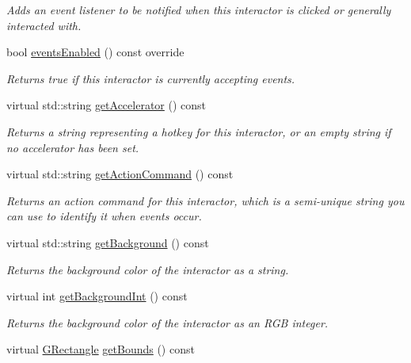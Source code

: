 \begin{DoxyCompactItemize}
\begin{DoxyCompactList}\small\item\em Adds an event listener to be notified when this interactor is clicked or generally interacted with. \end{DoxyCompactList}\item 
bool \mbox{\hyperlink{classGInteractor_a597a370b592e3737d38d9d2f4e2031ea}{events\+Enabled}} () const override
\begin{DoxyCompactList}\small\item\em Returns true if this interactor is currently accepting events. \end{DoxyCompactList}\item 
virtual std\+::string \mbox{\hyperlink{classGInteractor_a69f8d23ed8f207fbecad99960776e942}{get\+Accelerator}} () const
\begin{DoxyCompactList}\small\item\em Returns a string representing a hotkey for this interactor, or an empty string if no accelerator has been set. \end{DoxyCompactList}\item 
virtual std\+::string \mbox{\hyperlink{classGInteractor_a94eb4276000c4fdfb508ce9e6317a82a}{get\+Action\+Command}} () const
\begin{DoxyCompactList}\small\item\em Returns an action command for this interactor, which is a semi-\/unique string you can use to identify it when events occur. \end{DoxyCompactList}\item 
virtual std\+::string \mbox{\hyperlink{classGInteractor_a808e22cc1fdfbecf71ed8c64ef4600e0}{get\+Background}} () const
\begin{DoxyCompactList}\small\item\em Returns the background color of the interactor as a string. \end{DoxyCompactList}\item 
virtual int \mbox{\hyperlink{classGInteractor_a9e827257a55cb8cf4d9de2ec6bcfd7a0}{get\+Background\+Int}} () const
\begin{DoxyCompactList}\small\item\em Returns the background color of the interactor as an R\+GB integer. \end{DoxyCompactList}\item 
virtual \mbox{\hyperlink{structGRectangle}{G\+Rectangle}} \mbox{\hyperlink{classGInteractor_a29e6ac35a0b48f491a4c88194cc5da3b}{get\+Bounds}} () const

\end{DoxyCompactItemize}
